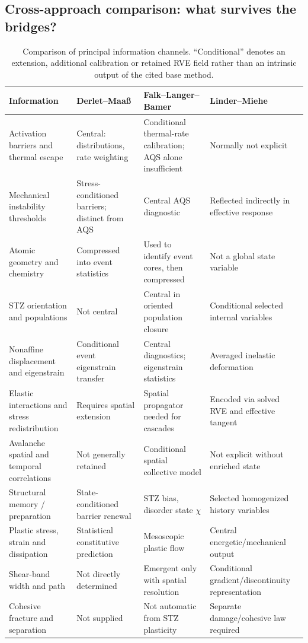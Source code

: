 \documentclass[11pt,a4paper]{article}
\begin{document}
\subsection{Cross-approach comparison: what survives the bridges?}
\begin{table}[H]
\caption{Comparison of principal information channels. ``Conditional'' denotes an extension, additional calibration or retained RVE field rather than an intrinsic output of the cited base method.}\label{tab:bridge_comparison}
\centering\scriptsize
\renewcommand{\arraystretch}{1.20}
\begin{tabularx}{\textwidth}{>{\raggedright\arraybackslash}p{} *{3}{>{\raggedright\arraybackslash}X}}
\toprule
\textbf{Information} & \textbf{Derlet--Maa\ss{}} & \textbf{Falk--Langer--Bamer} & \textbf{Linder--Miehe}\\
\midrule
Activation barriers and thermal escape & Central: distributions, rate weighting & Conditional thermal-rate calibration; AQS alone insufficient & Normally not explicit \\
Mechanical instability thresholds & Stress-conditioned barriers; distinct from AQS & Central AQS diagnostic & Reflected indirectly in effective response \\
Atomic geometry and chemistry & Compressed into event statistics & Used to identify event cores, then compressed & Not a global state variable \\
STZ orientation and populations & Not central & Central in oriented population closure & Conditional selected internal variables \\
Nonaffine displacement and eigenstrain & Conditional event eigenstrain transfer & Central diagnostics; eigenstrain statistics & Averaged inelastic deformation \\
Elastic interactions and stress redistribution & Requires spatial extension & Spatial propagator needed for cascades & Encoded via solved RVE and effective tangent \\
Avalanche spatial and temporal correlations & Not generally retained & Conditional spatial collective model & Not explicit without enriched state \\
Structural memory / preparation & State-conditioned barrier renewal & STZ bias, disorder state $\chi$ & Selected homogenized history variables \\
Plastic stress, strain and dissipation & Statistical constitutive prediction & Mesoscopic plastic flow & Central energetic/mechanical output \\
Shear-band width and path & Not directly determined & Emergent only with spatial resolution & Conditional gradient/discontinuity representation \\
Cohesive fracture and separation & Not supplied & Not automatic from STZ plasticity & Separate damage/cohesive law required \\
\bottomrule
\end{tabularx}
\end{table}
\FloatBarrier
\end{document}

